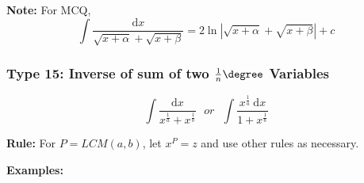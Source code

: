         \begin{center}
          \textbf{Note:} For MCQ, \[
            \int \frac{\mathrm{d}x}{\sqrt{x+\alpha}+\sqrt{x+\beta}} = 2\ln|\sqrt{x+\alpha} + \sqrt{x+\beta}| + c 
          \]
        \end{center}

      \subsubsection{Type 15: Inverse of sum of two $\frac{1}{n}\degree$ Variables}

        \begin{equation}
          \int \frac{\mathrm{d}x}{x^{\frac{1}{a}}+x^{\frac{1}{b}}} \ \ \ or \ \ \ 
          \int \frac{x^{\frac{1}{a}}\ \mathrm{d}x}{1+x^{\frac{1}{b}}}
        \end{equation}

        \begin{center}
          \textbf{Rule:} For $P = LCM(a,b)$, let $x^P = z$ and use other rules as necessary.
        \end{center}

        \textbf{Examples:}

